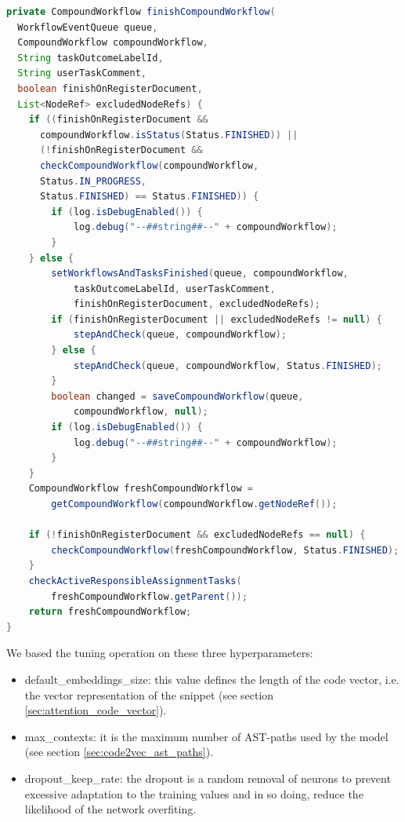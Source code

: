 \begin{lstlisting}[caption={Code snippet with 199 tokens}, label={lst:snippet199},language=Java]
private CompoundWorkflow finishCompoundWorkflow(
  WorkflowEventQueue queue,
  CompoundWorkflow compoundWorkflow, 
  String taskOutcomeLabelId, 
  String userTaskComment, 
  boolean finishOnRegisterDocument, 
  List<NodeRef> excludedNodeRefs) {
    if ((finishOnRegisterDocument &&
      compoundWorkflow.isStatus(Status.FINISHED)) ||
      (!finishOnRegisterDocument &&
      checkCompoundWorkflow(compoundWorkflow,
      Status.IN_PROGRESS, 
      Status.FINISHED) == Status.FINISHED)) {
        if (log.isDebugEnabled()) {
            log.debug("--##string##--" + compoundWorkflow);
        }
    } else {
        setWorkflowsAndTasksFinished(queue, compoundWorkflow, 
            taskOutcomeLabelId, userTaskComment,
            finishOnRegisterDocument, excludedNodeRefs);
        if (finishOnRegisterDocument || excludedNodeRefs != null) {
            stepAndCheck(queue, compoundWorkflow);
        } else {
            stepAndCheck(queue, compoundWorkflow, Status.FINISHED);
        }
        boolean changed = saveCompoundWorkflow(queue,
            compoundWorkflow, null);
        if (log.isDebugEnabled()) {
            log.debug("--##string##--" + compoundWorkflow);
        }
    }
    CompoundWorkflow freshCompoundWorkflow =
        getCompoundWorkflow(compoundWorkflow.getNodeRef());
        
    if (!finishOnRegisterDocument && excludedNodeRefs == null) {
        checkCompoundWorkflow(freshCompoundWorkflow, Status.FINISHED);
    }
    checkActiveResponsibleAssignmentTasks(
        freshCompoundWorkflow.getParent());
    return freshCompoundWorkflow;
}
\end{lstlisting}

\noindent We based the tuning operation on these three hyperparameters:
\begin{itemize}
    \item default\_embeddings\_size: this value defines the length of the code vector, i.e. the vector representation of the snippet (see section \ref{sec:attention_code_vector}).
    \item max\_contexts: it is the maximum number of AST-paths used by the model (see section \ref{sec:code2vec_ast_paths}).
    \item dropout\_keep\_rate: the dropout is a random removal of neurons to prevent excessive adaptation to the training values and in so doing, reduce the likelihood of the network overfiting.
\end{itemize}

